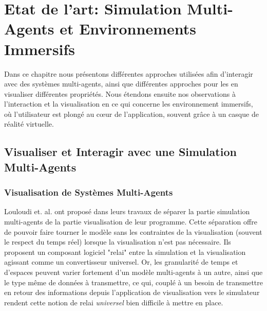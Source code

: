 \chapter{Etat de l'art: Simulation Multi-Agents et Environnements Immersifs}

	Dans ce chapitre nous présentons différentes approches utilisées afin d'interagir avec des systèmes multi-agents, ainsi que différentes approches pour les en visualiser différentes propriétés. Nous étendons ensuite nos observations à l'interaction et la visualisation en ce qui concerne les environnement immersifs, où l'utilisateur est plongé au cœur de l'application, souvent grâce à un casque de réalité virtuelle.
	

	\section{Visualiser et Interagir avec une Simulation Multi-Agents}
		
		
		\subsection{Visualisation de Systèmes Multi-Agents}
		
		Louloudi et. al. \cite{louloudi_new_2012} ont proposé dans leurs travaux de séparer la partie simulation multi-agents de la partie visualisation de leur programme. Cette séparation offre de pouvoir faire tourner le modèle sans les contraintes de la visualisation (souvent le respect du temps réel) lorsque la visualisation n'est pas nécessaire. Ils proposent un composant logiciel "relai" entre la simulation et la visualisation agissant comme un convertisseur universel. Or, les granularité de temps et d'espaces peuvent varier fortement d'un modèle multi-agents à un autre, ainsi que le type même de données à transmettre, ce qui, couplé à un besoin de transmettre en retour des informations depuis l'application de visualisation vers le simulateur rendent cette notion de relai \textit{universel} bien difficile à mettre en place.
		

